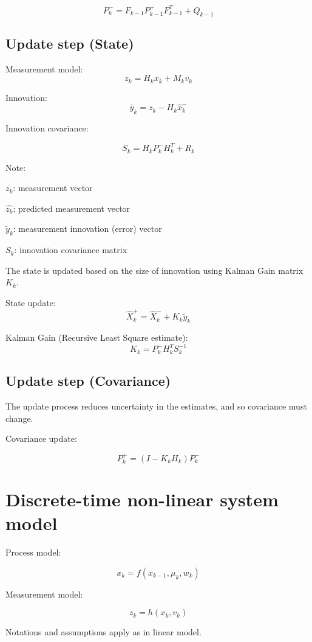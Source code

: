 \documentclass[11pt]{article}
\begin{document}
\[ P^-_k = F_{k-1} P^+_{k-1} F^T_{k-1} + Q_{k-1} \]



\subsection{Update step (State)}

Measurement model:
\[ z_k = H_k x_k + M_k v_k \] 

Innovation:
\[ \tilde{y_k} = z_k - H_k \hat{x}^-_k \]

Innovation covariance: 

\[ S_k = H_k P_k^- H^T_k + R_k \]

Note:

$z_k$: measurement vector 

$\hat{z_k}$: predicted measurement vector 

$\tilde{y}_k$: measurement innovation (error) vector 

$S_k$: innovation covariance matrix 

The state is updated based on the size of innovation using Kalman Gain matrix $K_k$.

State update: 
\[ \hat{X}^+_k = \hat{X}^-_k + K_k \tilde{y}_k \]

Kalman Gain (Recursive Least Square estimate):
\[ K_k = P^-_k H^T_k S^{-1}_k \]
\subsection{Update step (Covariance)}

The update process reduces uncertainty in the estimates, and so covariance must change.

Covariance update:

\[ P^+_k = (I- K_k H_k) P^-_{k} \] 


\section{Discrete-time non-linear system model}

Process model:

\[ x_k = f(x_{k-1}, \mu_k, w_k) \] 

Measurement model: 

\[ z_k = h(x_k, v_k) \]

Notations and assumptions apply as in linear model.
\end{document}
